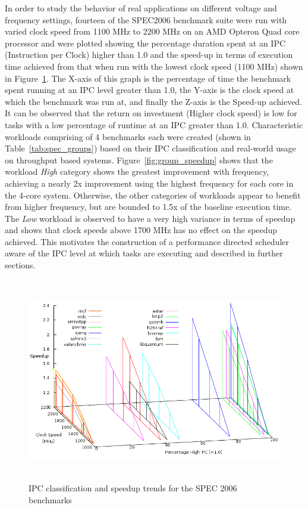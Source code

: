 In order to study the behavior of real applications on different voltage and frequency settings,
fourteen of the SPEC2006 \cite{spec:2006} benchmark suite were run with varied clock speed 
from 1100 MHz to 2200 MHz on an AMD Opteron Quad core processor and were plotted showing the 
percentage duration spent at an IPC (Instruction per Clock) higher than 1.0 and the 
speed-up in terms of execution time achieved from that when run with the lowest clock speed (1100 MHz)
shown in Figure~\ref{fig:spec_classify}.
The X-axis of this graph is the percentage of time the benchmark spent running at an IPC level greater
than 1.0, the Y-axis is the clock speed at which the benchmark was run at, and finally the Z-axis 
is the Speed-up achieved. It can be observed that the return on investment (Higher clock speed)
is low for tasks with a low percentage of runtime at an IPC greater than 1.0. Characteristic workloads
comprising of 4 benchmarks each were created (shown in Table~\ref{tab:spec_groups}) based on their IPC classification
and real-world usage on throughput based systems. Figure~\ref{fig:group_speedup} shows that the workload 
\textit{High} category shows the greatest improvement with frequency, achieving a nearly 2x improvement using the highest
frequency for each core in the 4-core system.  Otherwise, the other
categories of workloads appear to benefit from higher frequency, but
are bounded to 1.5x of the baseline execution time. The \textit{Low} workload is observed to have a very 
high variance in terms of speedup and shows that clock speeds above 1700 MHz has no effect on the speedup achieved.
This motivates the construction of a performance directed scheduler aware of the IPC
level at which tasks are executing and described in further sections. 

\begin{figure}[h!]
  \begin{center}
    \includegraphics[height=3.5in]{figures/Speedup_Classify.png}
    \caption{IPC classification and speedup trends for the SPEC 2006 benchmarks}
    \label{fig:spec_classify}
  \end{center}
\end{figure}

